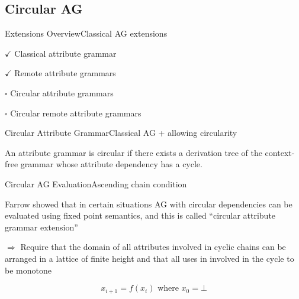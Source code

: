 \subsection*{Circular AG}{}

\begin{frame}{Extensions Overview}{Classical AG extensions}
     \begin{description}
        \item $\checkmark$ Classical attribute grammar
        \item $\checkmark$  Remote attribute grammars
        \item $\square$  \alert{Circular attribute grammars}
        \item $\square$  Circular remote attribute grammars
    \end{description}
\end{frame}


\begin{frame}{Circular Attribute Grammar}{Classical AG + allowing circularity}
\begin{definition}
An attribute grammar is \alert{circular} if there exists a derivation tree of the context-free grammar whose \alert{attribute dependency has a cycle}.
\end{definition}
\end{frame}



\begin{frame}{Circular AG Evaluation}{Ascending chain condition}

Farrow showed that \alert{in certain situations} AG with circular dependencies can be evaluated using fixed point semantics, and this is called \enquote{circular attribute grammar extension}


\newlinevspace

$\Rightarrow$ Require that the domain of all attributes involved in cyclic chains can be arranged in a \alert{lattice of finite height} and that all uses in involved in the cycle to be \alert{monotone}

\[ x_{i+1} = f(x_i) \text{ where } x_0 = \bot \]

\end{frame}

